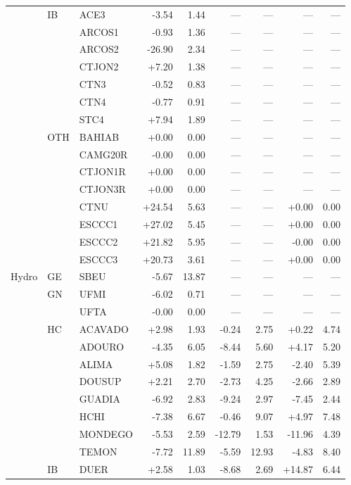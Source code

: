 \begin{tabular}{l l l r r r r r r}
 & IB & ACE3 & -3.54 & 1.44 & --- & --- & --- & --- \\
 &  & ARCOS1 & -0.93 & 1.36 & --- & --- & --- & --- \\
 &  & ARCOS2 & -26.90 & 2.34 & --- & --- & --- & --- \\
 &  & CTJON2 & +7.20 & 1.38 & --- & --- & --- & --- \\
 &  & CTN3 & -0.52 & 0.83 & --- & --- & --- & --- \\
 &  & CTN4 & -0.77 & 0.91 & --- & --- & --- & --- \\
 &  & STC4 & +7.94 & 1.89 & --- & --- & --- & --- \\
 & OTH & BAHIAB & +0.00 & 0.00 & --- & --- & --- & --- \\
 &  & CAMG20R & -0.00 & 0.00 & --- & --- & --- & --- \\
 &  & CTJON1R & +0.00 & 0.00 & --- & --- & --- & --- \\
 &  & CTJON3R & +0.00 & 0.00 & --- & --- & --- & --- \\
 &  & CTNU & +24.54 & 5.63 & --- & --- & +0.00 & 0.00 \\
 &  & ESCCC1 & +27.02 & 5.45 & --- & --- & +0.00 & 0.00 \\
 &  & ESCCC2 & +21.82 & 5.95 & --- & --- & -0.00 & 0.00 \\
 &  & ESCCC3 & +20.73 & 3.61 & --- & --- & +0.00 & 0.00 \\
\addlinespace
Hydro & GE & SBEU & -5.67 & 13.87 & --- & --- & --- & --- \\
 & GN & UFMI & -6.02 & 0.71 & --- & --- & --- & --- \\
 &  & UFTA & -0.00 & 0.00 & --- & --- & --- & --- \\
 & HC & ACAVADO & +2.98 & 1.93 & -0.24 & 2.75 & +0.22 & 4.74 \\
 &  & ADOURO & -4.35 & 6.05 & -8.44 & 5.60 & +4.17 & 5.20 \\
 &  & ALIMA & +5.08 & 1.82 & -1.59 & 2.75 & -2.40 & 5.39 \\
 &  & DOUSUP & +2.21 & 2.70 & -2.73 & 4.25 & -2.66 & 2.89 \\
 &  & GUADIA & -6.92 & 2.83 & -9.24 & 2.97 & -7.45 & 2.44 \\
 &  & HCHI & -7.38 & 6.67 & -0.46 & 9.07 & +4.97 & 7.48 \\
 &  & MONDEGO & -5.53 & 2.59 & -12.79 & 1.53 & -11.96 & 4.39 \\
 &  & TEMON & -7.72 & 11.89 & -5.59 & 12.93 & -4.83 & 8.40 \\
 & IB & DUER & +2.58 & 1.03 & -8.68 & 2.69 & +14.87 & 6.44 \\

\end{tabular}
